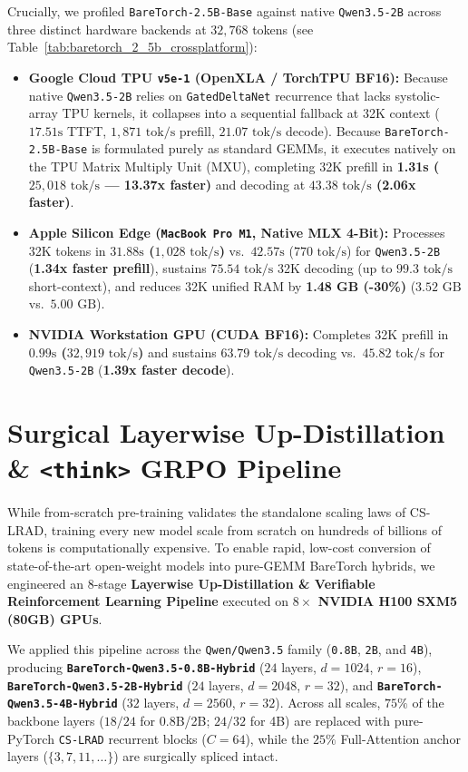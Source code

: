 \documentclass[twocolumn,10pt]{article}
\begin{document}
Crucially, we profiled \texttt{BareTorch-2.5B-Base} against native \texttt{Qwen3.5-2B} across three distinct hardware backends at $32,768$ tokens (see Table~\ref{tab:baretorch_2_5b_crossplatform}):
\begin{itemize}
    \item \textbf{Google Cloud TPU \texttt{v5e-1} (OpenXLA / TorchTPU BF16):} Because native \texttt{Qwen3.5-2B} relies on \texttt{GatedDeltaNet} recurrence that lacks systolic-array TPU kernels, it collapses into a sequential fallback at 32K context ($17.51\text{s}$ TTFT, $1,871\text{ tok/s}$ prefill, $21.07\text{ tok/s}$ decode). Because \texttt{BareTorch-2.5B-Base} is formulated purely as standard GEMMs, it executes natively on the TPU Matrix Multiply Unit (MXU), completing 32K prefill in \textbf{1.31s ($25,018\text{ tok/s}$ --- 13.37x faster)} and decoding at \textbf{$43.38\text{ tok/s}$ (2.06x faster)}.
    \item \textbf{Apple Silicon Edge (\texttt{MacBook Pro M1}, Native MLX 4-Bit):} Processes 32K tokens in \textbf{$31.88\text{s}$ ($1,028\text{ tok/s}$)} vs.\ $42.57\text{s}$ ($770\text{ tok/s}$) for \texttt{Qwen3.5-2B} (\textbf{1.34x faster prefill}), sustains \textbf{$75.54\text{ tok/s}$} 32K decoding (up to $99.3\text{ tok/s}$ short-context), and reduces 32K unified RAM by \textbf{1.48 GB (-30\%)} ($3.52\text{ GB}$ vs.\ $5.00\text{ GB}$).
    \item \textbf{NVIDIA Workstation GPU (CUDA BF16):} Completes 32K prefill in \textbf{$0.99\text{s}$ ($32,919\text{ tok/s}$)} and sustains \textbf{$63.79\text{ tok/s}$} decoding vs.\ $45.82\text{ tok/s}$ for \texttt{Qwen3.5-2B} (\textbf{1.39x faster decode}).
\end{itemize}

\section{Surgical Layerwise Up-Distillation \& \texttt{<think>} GRPO Pipeline}
While from-scratch pre-training validates the standalone scaling laws of CS-LRAD, training every new model scale from scratch on hundreds of billions of tokens is computationally expensive. To enable rapid, low-cost conversion of state-of-the-art open-weight models into pure-GEMM BareTorch hybrids, we engineered an 8-stage \textbf{Layerwise Up-Distillation \& Verifiable Reinforcement Learning Pipeline} executed on \textbf{$8\times$ NVIDIA H100 SXM5 (80GB) GPUs}.

We applied this pipeline across the \texttt{Qwen/Qwen3.5} family (\texttt{0.8B}, \texttt{2B}, and \texttt{4B}), producing \textbf{\texttt{BareTorch-Qwen3.5-0.8B-Hybrid}} ($24$ layers, $d=1024$, $r=16$), \textbf{\texttt{BareTorch-Qwen3.5-2B-Hybrid}} ($24$ layers, $d=2048$, $r=32$), and \textbf{\texttt{BareTorch-Qwen3.5-4B-Hybrid}} ($32$ layers, $d=2560$, $r=32$). Across all scales, $75\%$ of the backbone layers ($18/24$ for 0.8B/2B; $24/32$ for 4B) are replaced with pure-PyTorch \texttt{CS-LRAD} recurrent blocks ($C=64$), while the $25\%$ Full-Attention anchor layers ($\{3, 7, 11, \dots\}$) are surgically spliced intact.
\end{document}
